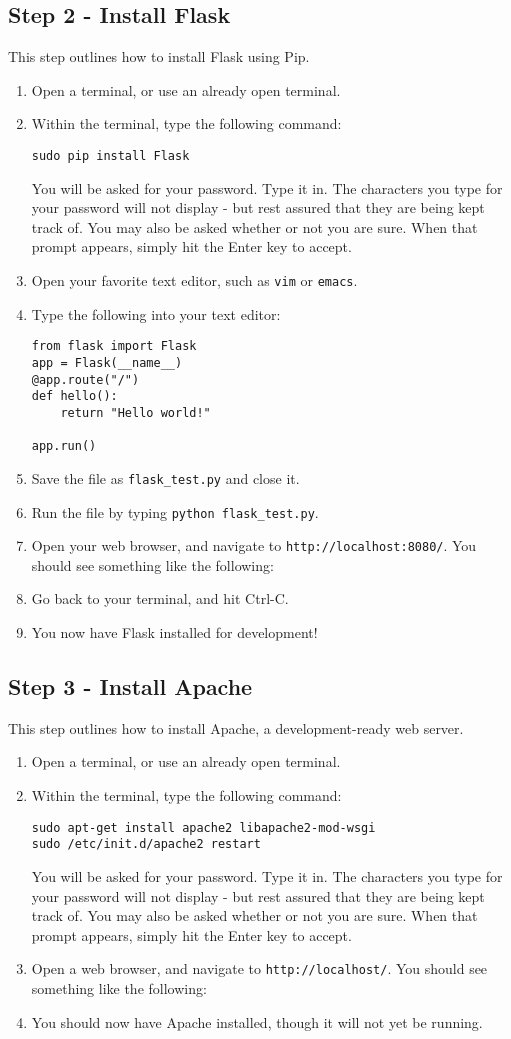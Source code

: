 \documentclass{article}
\begin{document}
\subsection{Step 2 - Install Flask}
This step outlines how to install Flask using Pip.
\begin{enumerate}
\item Open a terminal, or use an already open terminal.
\item Within the terminal, type the following command:
\begin{verbatim}
sudo pip install Flask
\end{verbatim}
You will be asked for your password. Type it in. The characters you type for your password
will not display - but rest assured that they are being kept track of. You
may also be asked whether or not you 
are sure. When that prompt appears, 
simply hit the Enter key to accept.
\item Open your favorite text editor,
such as \verb+vim+ or \verb+emacs+.
\item Type the following into your
text editor:
\begin{verbatim}
from flask import Flask
app = Flask(__name__)
@app.route("/")
def hello():
    return "Hello world!"

app.run()
\end{verbatim}
\item Save the file as \verb+flask_test.py+ and close it.
\item Run the file by typing \verb+python flask_test.py+.
\item Open your web browser, and navigate to \verb+http://localhost:8080/+. You should see something like the following:
\item Go back to your terminal, and hit Ctrl-C.
\item You now have Flask installed for development!
\end{enumerate}
\subsection{Step 3 - Install Apache}
This step outlines how to install Apache, a development-ready web server.
\begin{enumerate}
\item Open a terminal, or use an already open terminal.
\item Within the terminal, type the following command:
\begin{verbatim}
sudo apt-get install apache2 libapache2-mod-wsgi
sudo /etc/init.d/apache2 restart
\end{verbatim}
You will be asked for your password. Type it in. The characters you type for your password
will not display - but rest assured that they are being kept track of. You
may also be asked whether or not you are sure. When that prompt appears, simply hit the Enter key
to accept.
\item Open a web browser, and navigate to \verb+http://localhost/+. You should see something like the following:
\item You should now have Apache installed, though it will not yet be running.
\end{enumerate}
\end{document}
